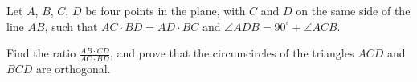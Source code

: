 Let $A$,  $B$,  $C$,  $D$ be four points in the plane, with $C$ and $D$ on the same side of the line $AB$,  such that $AC \cdot BD = AD \cdot BC$ and $\angle ADB = 90^{\circ}+\angle ACB$.

Find the ratio $\frac{AB \cdot CD}{AC \cdot BD}$, and prove that the circumcircles of the triangles $ACD$ and $BCD$
 are orthogonal. 
